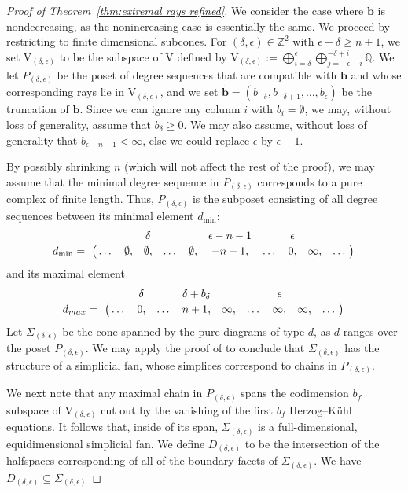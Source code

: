 \documentclass[12pt]{amsart}
\theoremstyle{definition}
\theoremstyle{remark}
\newcommand{\ZZ}{\mathbb{Z}}
\newcommand{\QQ}{\mathbb{Q}}
\newcommand{\VV}{\mathrm{V}}
\newcommand{\bb}{\mathbf{b}}
\begin{document}
\begin{proof}[Proof of Theorem~\ref{thm:extremal rays refined}]
We consider the case where $\bb$ is nondecreasing, as the nonincreasing case is essentially the same.  We proceed by restricting to finite dimensional subcones.  For $(\delta,\epsilon)\in \ZZ^2$ with $\epsilon-\delta\geq n+1$, we set $\VV_{(\delta,\epsilon)}$ to be the subspace of $\VV$ defined by $\VV_{(\delta,\epsilon)}:=\bigoplus_{i=\delta}^\epsilon \bigoplus_{j=-\epsilon +i}^{-\delta+i} \QQ$.  We let $P_{(\delta,\epsilon)}$ be the poset of degree sequences that are compatible with $\bb$ and whose corresponding rays lie in $\VV_{(\delta,\epsilon)}$, and we set $\widetilde{\bb}=(b_{-\delta},b_{-\delta+1},\dots, b_{\epsilon})$ be the truncation of $\bb$.  Since we can ignore any column $i$ with $b_i=\emptyset$, we may, without loss of generality, assume that $b_\delta \geq 0$.  We may also assume, without loss of generality that $b_{\epsilon-n-1}<\infty$, else we could replace $\epsilon$ by $\epsilon-1$.  

By possibly shrinking $n$ (which will not affect the rest of the proof), we may assume that the minimal degree sequence in $P_{(\delta,\epsilon)}$ corresponds to a pure complex of finite length.  Thus, $P_{(\delta,\epsilon)}$ is the subposet consisting of all degree sequences between its minimal element $d_{\min}$:
\[\bordermatrix{&&&\delta&&&\epsilon-n-1&&\epsilon &&\cr
              d_{\min}= &\dots&\emptyset,&\emptyset,&\dots&\emptyset,&-n-1,&\dots &0, &\infty,&\dots\cr}\]
and its maximal element
\[\bordermatrix{&&\delta&&\delta+b_\delta&&&\epsilon &&\cr
              d_{max}= &\dots&0,&\dots&n+1,&\infty,&\dots &\infty,&\infty,&\dots\cr}\]
Let $\Sigma_{(\delta,\epsilon)}$ be the cone spanned by the pure diagrams of type $d$, as $d$ ranges over the poset $P_{(\delta,\epsilon)}$.  We may apply the proof of  \cite[2.9]{boij-sod1} to conclude that $\Sigma_{(\delta,\epsilon)}$ has the structure of a simplicial fan, whose simplices correspond to chains in $P_{(\delta,\epsilon)}$.

We next note that any maximal chain in $P_{(\delta,\epsilon)}$ spans the codimension $b_f$ subspace of $\VV_{(\delta,\epsilon)}$ cut out by the vanishing of the first $b_f$ Herzog--K\"uhl equations.  It follows that, inside of its span, $\Sigma_{(\delta,\epsilon)}$ is a full-dimensional, equidimensional simplicial fan.  We define $D_{(\delta,\epsilon)}$ to be the intersection of the halfspaces corresponding of all of the boundary facets of $\Sigma_{(\delta,\epsilon)}$.  We have $D_{(\delta,\epsilon)}\subseteq \Sigma_{(\delta,\epsilon)}$ 


\end{proof}
\end{document}
